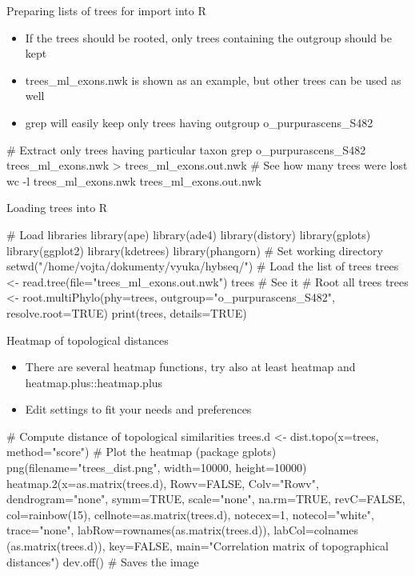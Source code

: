 \documentclass[compress, ucs, xelatex, 11pt, xcolor=x11names, aspectratio=169,
	hyperref={
		bookmarks=true,
		unicode=true,
		colorlinks=true,
		pdftitle={HybSeq course},
		plainpages=false,
		pdfauthor={Vojtech Zeisek},
		pdfsubject={Practical processing of HybSeq target enrichment sequencing data on computing grids like MetaCentrum},
		pdfcreator={XeLaTeX},
		pdfkeywords={BASH, command line, GNU, HybSeq, Linux, MetaCentrum, sequencing shell, target enrichment},
		linkcolor=Cyan2, %
		anchorcolor=Firebrick2, %
		citecolor=Firebrick2, %
		filecolor=Firebrick2, %
		menucolor=Firebrick2, %
		urlcolor=Chartreuse2, %
		pdftex},
	url={hyphens, lowtilde} %
	]{beamer}
\renewcommand{\texttt}[1]{\colorbox{Snow4}{{\ttfamily #1}}}
\begin{document}
\begin{frame}[fragile]{Preparing lists of trees for import into R}
	\begin{itemize}
		\item If the trees should be rooted, only trees containing the outgroup should be kept
		\item \texttt{trees\_ml\_exons.nwk} is shown as an example, but other trees can be used as well
		\item \texttt{grep} will easily keep only trees having outgroup \texttt{o\_purpurascens\_S482}
	\end{itemize}
	\begin{bashcode}
    # Extract only trees having particular taxon
    grep o_purpurascens_S482 trees_ml_exons.nwk > trees_ml_exons.out.nwk
    # See how many trees were lost
    wc -l trees_ml_exons.nwk trees_ml_exons.out.nwk
	\end{bashcode}
\end{frame}

\begin{frame}[fragile]{Loading trees into R}
	\begin{spluscode}
    # Load libraries
    library(ape)
    library(ade4)
    library(distory)
    library(gplots)
    library(ggplot2)
    library(kdetrees)
    library(phangorn)
    # Set working directory
    setwd("/home/vojta/dokumenty/vyuka/hybseq/")
    # Load the list of trees
    trees <- read.tree(file="trees_ml_exons.out.nwk")
    trees # See it
    # Root all trees
    trees <- root.multiPhylo(phy=trees, outgroup="o_purpurascens_S482",
      resolve.root=TRUE)
    print(trees, details=TRUE)
	\end{spluscode}
\end{frame}

\begin{frame}[fragile]{Heatmap of topological distances}
	\begin{itemize}
		\item There are several heatmap functions, try also at least \texttt{heatmap} and \texttt{heatmap.plus::heatmap.plus}
		\item Edit settings to fit your needs and preferences
	\end{itemize}
	\begin{spluscode}
    # Compute distance of topological similarities
    trees.d <- dist.topo(x=trees, method="score")
    # Plot the heatmap (package gplots)
    png(filename="trees_dist.png", width=10000, height=10000)
      heatmap.2(x=as.matrix(trees.d), Rowv=FALSE, Colv="Rowv",
        dendrogram="none", symm=TRUE, scale="none", na.rm=TRUE,
        revC=FALSE, col=rainbow(15), cellnote=as.matrix(trees.d),
        notecex=1, notecol="white", trace="none",
        labRow=rownames(as.matrix(trees.d)), labCol=colnames
        (as.matrix(trees.d)), key=FALSE, main="Correlation
        matrix of topographical distances")
      dev.off() # Saves the image
	\end{spluscode}
\end{frame}
\end{document}
